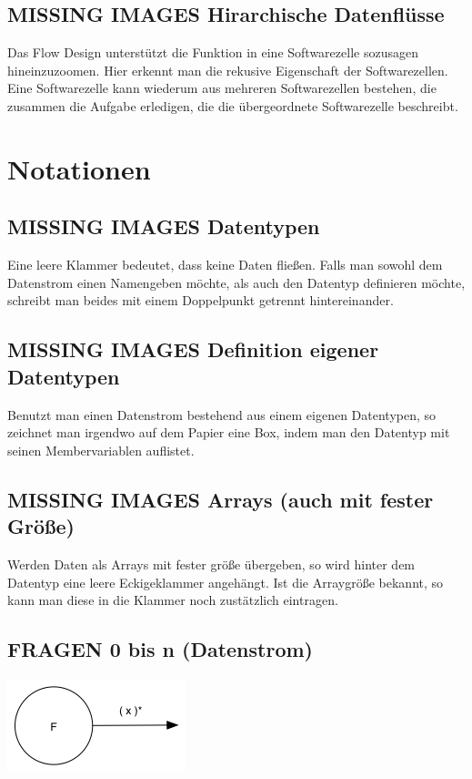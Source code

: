 \documentclass[11pt]{article}
\begin{document}
\subsection{{\bfseries\sffamily MISSING IMAGES} Hirarchische Datenflüsse}
\label{sec:orgheadline18}
Das Flow Design unterstützt die Funktion in eine Softwarezelle sozusagen hineinzuzoomen.
Hier erkennt man die rekusive Eigenschaft der Softwarezellen. Eine Softwarezelle kann wiederum aus mehreren Softwarezellen bestehen,
die zusammen die Aufgabe erledigen, die die übergeordnete Softwarezelle beschreibt.


\section{Notationen}
\label{sec:orgheadline33}
\subsection{{\bfseries\sffamily MISSING IMAGES} Datentypen}
\label{sec:orgheadline20}

Eine leere Klammer bedeutet, dass keine Daten fließen.
Falls man sowohl dem Datenstrom einen Namengeben möchte, als auch den Datentyp definieren möchte, schreibt man beides mit einem
Doppelpunkt getrennt hintereinander.
\subsection{{\bfseries\sffamily MISSING IMAGES} Definition eigener Datentypen}
\label{sec:orgheadline21}
Benutzt man einen Datenstrom bestehend aus einem eigenen Datentypen, so zeichnet man irgendwo auf dem Papier eine Box,
indem man den Datentyp mit seinen Membervariablen auflistet.

\subsection{{\bfseries\sffamily MISSING IMAGES} Arrays (auch mit fester Größe)}
\label{sec:orgheadline22}
Werden Daten als Arrays mit fester größe übergeben, so wird hinter dem Datentyp eine leere Eckigeklammer angehängt.
Ist die Arraygröße bekannt, so kann man diese in die Klammer noch zustätzlich eintragen.
\subsection{{\bfseries\sffamily FRAGEN} 0 bis n (Datenstrom)}
\label{sec:orgheadline23}

\includegraphics[width=.9\linewidth]{./img/diagram0n.png}
\end{document}

